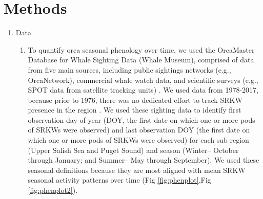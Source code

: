 \documentclass{article}
\begin{document}
\section* {Methods}
\begin{enumerate}
\item Data
\begin{enumerate}
\item To quantify orca seasonal phenology over time, we used the OrcaMaster Database for Whale Sighting Data (Whale Museum), comprised of data from five main sources, including public sightings networks (e.g., OrcaNetwork), commercial whale watch data, and scientific surveys (e.g., SPOT data from satellite tracking units) \citep{olson2018}. We used data from 1978-2017, because prior to 1976, there was no dedicated effort to track SRKW presence in the region \citep{olson2018}. We used these sighting data to identify first observation day-of-year (DOY, the first date on which one or more pods of SRKWs were observed) and last observation DOY (the first date on which one or more pods of SRKWs were observed) for each sub-region (Upper Salish Sea and Puget Sound) and season (Winter-- October through January; and Summer-- May through September). We used these seasonal definitions because they are most aligned with mean SRKW seasonal activity patterns over time (Fig \ref{fig:phenplot},Fig \ref{fig:phenplot2}).



\end{enumerate}
\end{enumerate}
\end{document}
